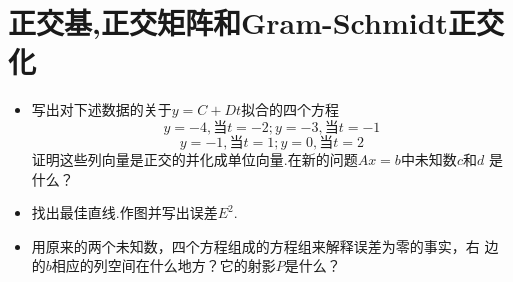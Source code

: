 ﻿\documentclass{book} \usepackage{exsheets} \usepackage{xeCJK}
\begin{document}
\section{正交基,正交矩阵和Gram-Schmidt正交化}
\begin{question}
\begin{itemize}
\item 写出对下述数据的关于$y=C+Dt$拟合的四个方程
$$
y=-4,\mbox{当}t=-2;y=-3,\mbox{当}t=-1
$$
$$
y=-1,\mbox{当}t=1;y=0,\mbox{当}t=2
$$
证明这些列向量是正交的并化成单位向量.在新的问题$Ax=b$中未知数$c$和$d$
是什么？
\item 找出最佳直线.作图并写出误差$E^2$.
\item 用原来的两个未知数，四个方程组成的方程组来解释误差为零的事实，右
  边的$b$相应的列空间在什么地方？它的射影$P$是什么？
\end{itemize}
\end{question}
\end{document}
